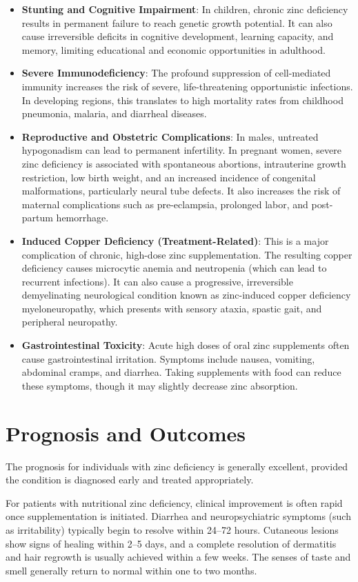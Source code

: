 \begin{itemize}
    \item \textbf{Stunting and Cognitive Impairment}: In children, chronic zinc deficiency results in permanent failure to reach genetic growth potential. It can also cause irreversible deficits in cognitive development, learning capacity, and memory, limiting educational and economic opportunities in adulthood.
    \item \textbf{Severe Immunodeficiency}: The profound suppression of cell-mediated immunity increases the risk of severe, life-threatening opportunistic infections. In developing regions, this translates to high mortality rates from childhood pneumonia, malaria, and diarrheal diseases.
    \item \textbf{Reproductive and Obstetric Complications}: In males, untreated hypogonadism can lead to permanent infertility. In pregnant women, severe zinc deficiency is associated with spontaneous abortions, intrauterine growth restriction, low birth weight, and an increased incidence of congenital malformations, particularly neural tube defects. It also increases the risk of maternal complications such as pre-eclampsia, prolonged labor, and post-partum hemorrhage.
    \item \textbf{Induced Copper Deficiency (Treatment-Related)}: This is a major complication of chronic, high-dose zinc supplementation. The resulting copper deficiency causes microcytic anemia and neutropenia (which can lead to recurrent infections). It can also cause a progressive, irreversible demyelinating neurological condition known as zinc-induced copper deficiency myeloneuropathy, which presents with sensory ataxia, spastic gait, and peripheral neuropathy.
    \item \textbf{Gastrointestinal Toxicity}: Acute high doses of oral zinc supplements often cause gastrointestinal irritation. Symptoms include nausea, vomiting, abdominal cramps, and diarrhea. Taking supplements with food can reduce these symptoms, though it may slightly decrease zinc absorption.
\end{itemize}

\section*{Prognosis and Outcomes}
The prognosis for individuals with zinc deficiency is generally excellent, provided the condition is diagnosed early and treated appropriately.

For patients with nutritional zinc deficiency, clinical improvement is often rapid once supplementation is initiated. Diarrhea and neuropsychiatric symptoms (such as irritability) typically begin to resolve within 24--72 hours. Cutaneous lesions show signs of healing within 2--5 days, and a complete resolution of dermatitis and hair regrowth is usually achieved within a few weeks. The senses of taste and smell generally return to normal within one to two months.

